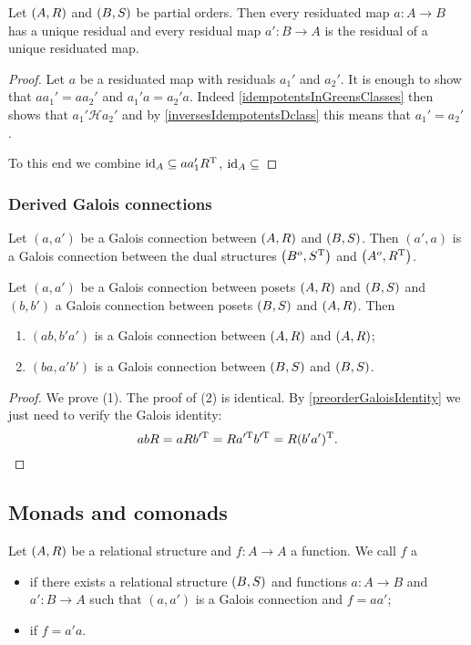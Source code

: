 \begin{proposition}
Let $\left( A,R \right)$ and $\left( B,S \right)$ be partial orders. Then every residuated map $a: A \to B$ has a unique residual and every residual map $a': B \to A$ is the residual of a unique residuated map.
\end{proposition}
\begin{proof}
Let $a$ be a residuated map with residuals $a_1'$ and $a_2'$. It is enough to show that $aa_1' = aa_2'$ and $a_1'a = a_2'a$. Indeed \ref{idempotentsInGreensClasses} then shows that $a_1'\mathcal{H}a_2'$ and by \ref{inversesIdempotentsDclass} this means that $a_1' = a_2'$.

To this end we combine $\operatorname{id}_A \subseteq aa_1'R^{\mathrm{T}}$, $\operatorname{id}_A \subseteq $
\end{proof}

\subsubsection{Derived Galois connections}
\begin{lemma}
Let $(a, a')$ be a Galois connection between $\left( A,R \right)$ and $\left( B,S \right)$. Then $(a',a)$ is a Galois connection between the dual structures $\left( B^o,S^{\mathrm{T}} \right)$ and $\left( A^o,R^{\mathrm{T}} \right)$.
\end{lemma}

\begin{lemma}
Let $(a, a')$ be a Galois connection between posets $\left( A,R \right)$ and $\left( B,S \right)$ and $(b, b')$ a Galois connection between posets $\left( B,S \right)$ and $\left( A,R \right)$. Then
\begin{enumerate}
\item $(ab, b'a')$ is a Galois connection between $\left( A,R \right)$ and $\left( A,R \right)$;
\item $(ba, a'b')$ is a Galois connection between $\left( B,S \right)$ and $\left( B,S \right)$.
\end{enumerate}
\end{lemma}
\begin{proof}
We prove (1). The proof of (2) is identical.
By \ref{preorderGaloisIdentity} we just need to verify the Galois identity:
\[ abR = aRb^{\prime\mathrm{T}} = Ra^{\prime\mathrm{T}}b^{\prime\mathrm{T}} = R(b'a')^{\mathrm{T}}. \]
\end{proof}

\subsection{Monads and comonads}
\begin{definition}
Let $\left( A,R \right)$ be a relational structure and $f: A\to A$ a function. We call $f$ a
\begin{itemize}
\item {} if there exists a relational structure $\left( B,S \right)$ and functions $a: A\to B$ and $a': B\to A$ such that $(a, a')$ is a Galois connection and $f = aa'$;
\item {} if $f = a'a$.
\end{itemize}
\end{definition}

